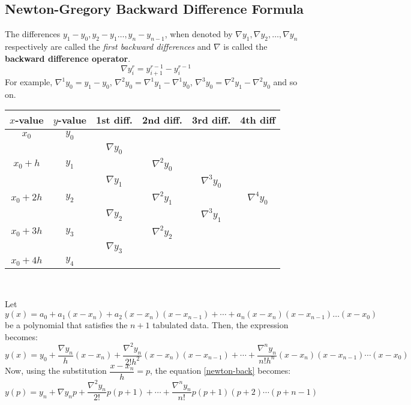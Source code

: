 \documentclass[12pt,a4paper,landscape]{article}
\begin{document}
		\subsection{Newton-Gregory Backward Difference Formula}
		The differences $y_1 - y_0,y_2 - y_1 \ldots, y_n - y_{n-1} $, when denoted by $\nabla y_1, \nabla y_2, \ldots, \nabla y_n$ respectively are called the \textit{first backward differences} and $\nabla$ is called the \textbf{backward difference operator}.
		\begin{equation}\label{back-op}
		\nabla y^r_i = y^{r-1}_{i+1} - y^{r-1}_{i}
		\end{equation}
		For example, $\nabla^1 y_0 = y_1 - y_0$, $\nabla^2 y_0 = \nabla^1 y_1 - \nabla^1 y_0$, $\nabla^3 y_0 = \nabla^2 y_1 - \nabla^2 y_0$  and so on.\\
		\begin{center}
			\begin{tabular}{cccccc}
				\hline
				$x$-value& $y$-value& 1st diff.& 2nd diff.& 3rd diff.& 4th diff\\ \hline
				$x_0$&	$y_0$&	&&&\\
				&& $\nabla y_0$&&&\\
				$x_0 + h$&	$y_1$	& & $\nabla^2 y_0$&&\\
				&& $\nabla y_1$& & $\nabla^3 y_0$&\\
				$x_0 + 2h$&	$y_2$	& & $\nabla^2 y_1$&& $\nabla^4 y_0$\\ 
				&& $\nabla y_2$& & $\nabla^3 y_1$&\\
				$x_0 + 3h$&	$y_3$	& & $\nabla^2 y_2$&&\\
				&& $\nabla y_3$&&&\\
				$x_0 + 4h$&	$y_4$	& & &&\\ \hline
			\end{tabular}\\
		\end{center}
		Let
		\[ y(x) = a_0 + a_1 (x - x_n) + a_2 (x-x_n)(x-x_{n-1}) + \cdots + a_n (x-x_n)(x-x_{n-1})\ldots (x-x_0) \]
		be a polynomial that satisfies the $n+1$ tabulated data. Then, the expression becomes:
		\begin{dmath}\label{newton-back}			
			y(x) = y_0 + \dfrac{\nabla y_n}{h} (x-x_n) + \dfrac{\nabla^2 y_n}{2! h^2} (x-x_n)(x-x_{n-1})+ \cdots + \dfrac{\nabla^n y_n}{n! h^n} (x-x_n)(x-x_{n-1})\cdots (x-x_0)
		\end{dmath}
		Now, using the substitution $\dfrac{x-x_n}{h} = p$, the equation \ref{newton-back} becomes:
		\begin{equation}\label{newton-back-p}
			\boxed{y(p) = y_n + \nabla y_n p + \dfrac{\nabla^2 y_n}{2!} p(p+1) + \cdots + \dfrac{\nabla^n y_n}{n!} p(p+1)(p+2)\cdots (p+n-1)}
		\end{equation}
		
\end{document}
